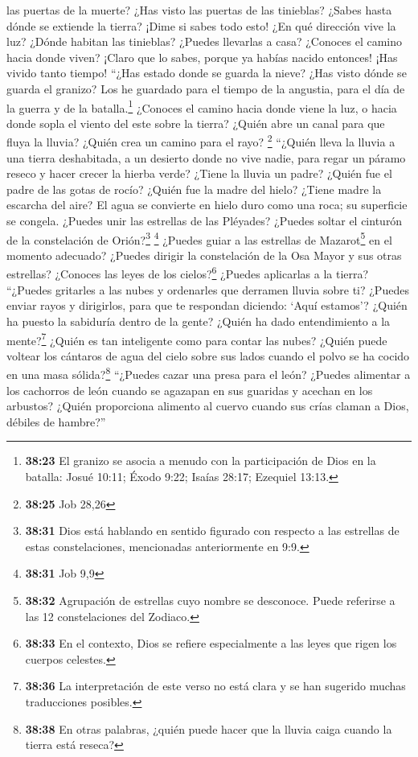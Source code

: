 las puertas de la muerte? ¿Has visto las puertas de las tinieblas?
 ¿Sabes hasta dónde se extiende la tierra? ¡Dime si sabes
todo esto!  ¿En qué dirección vive la luz? ¿Dónde habitan
las tinieblas?  ¿Puedes llevarlas a casa? ¿Conoces el
camino hacia donde viven?  ¡Claro que lo sabes, porque ya
habías nacido entonces! ¡Has vivido tanto tiempo!  ``¿Has
estado donde se guarda la nieve? ¿Has visto dónde se guarda el granizo?
 Los he guardado para el tiempo de la angustia, para el
día de la guerra y de la batalla.\footnote{\textbf{38:23} El granizo se
  asocia a menudo con la participación de Dios en la batalla: Josué
  10:11; Éxodo 9:22; Isaías 28:17; Ezequiel 13:13.} 
¿Conoces el camino hacia donde viene la luz, o hacia donde sopla el
viento del este sobre la tierra?  ¿Quién abre un canal
para que fluya la lluvia? ¿Quién crea un camino para el rayo?
\footnote{\textbf{38:25} Job 28,26}  ``¿Quién lleva la
lluvia a una tierra deshabitada, a un desierto donde no vive nadie,
 para regar un páramo reseco y hacer crecer la hierba
verde?  ¿Tiene la lluvia un padre? ¿Quién fue el padre de
las gotas de rocío?  ¿Quién fue la madre del hielo?
¿Tiene madre la escarcha del aire?  El agua se convierte
en hielo duro como una roca; su superficie se congela. 
¿Puedes unir las estrellas de las Pléyades? ¿Puedes soltar el cinturón
de la constelación de Orión?\footnote{\textbf{38:31} Dios está hablando
  en sentido figurado con respecto a las estrellas de estas
  constelaciones, mencionadas anteriormente en 9:9.} \footnote{\textbf{38:31}
  Job 9,9}  ¿Puedes guiar a las estrellas de
Mazarot\footnote{\textbf{38:32} Agrupación de estrellas cuyo nombre se
  desconoce. Puede referirse a las 12 constelaciones del Zodiaco.} en el
momento adecuado? ¿Puedes dirigir la constelación de la Osa Mayor y sus
otras estrellas?  ¿Conoces las leyes de los
cielos?\footnote{\textbf{38:33} En el contexto, Dios se refiere
  especialmente a las leyes que rigen los cuerpos celestes.} ¿Puedes
aplicarlas a la tierra?  ``¿Puedes gritarles a las nubes
y ordenarles que derramen lluvia sobre ti?  ¿Puedes
enviar rayos y dirigirlos, para que te respondan diciendo: `Aquí
estamos'?  ¿Quién ha puesto la sabiduría dentro de la
gente? ¿Quién ha dado entendimiento a la mente?\footnote{\textbf{38:36}
  La interpretación de este verso no está clara y se han sugerido muchas
  traducciones posibles.}  ¿Quién es tan inteligente como
para contar las nubes? ¿Quién puede voltear los cántaros de agua del
cielo sobre sus lados  cuando el polvo se ha cocido en
una masa sólida?\footnote{\textbf{38:38} En otras palabras, ¿quién puede
  hacer que la lluvia caiga cuando la tierra está reseca?}
 ``¿Puedes cazar una presa para el león? ¿Puedes
alimentar a los cachorros de león  cuando se agazapan en
sus guaridas y acechan en los arbustos?  ¿Quién
proporciona alimento al cuervo cuando sus crías claman a Dios, débiles
de hambre?''

